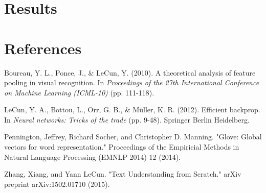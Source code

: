 \documentclass{article}
\begin{document}
\section*{Results}


\section*{References}

Boureau, Y. L., Ponce, J., \& LeCun, Y. (2010). A theoretical analysis of feature pooling in visual recognition. In \emph{Proceedings of the 27th International Conference on Machine Learning (ICML-10)} (pp. 111-118).

LeCun, Y. A., Bottou, L., Orr, G. B., \& Müller, K. R. (2012). Efficient backprop. In \emph{Neural networks: Tricks of the trade} (pp. 9-48). Springer Berlin Heidelberg.

Pennington, Jeffrey, Richard Socher, and Christopher D. Manning. "Glove: Global vectors for word representation." Proceedings of the Empiricial Methods in Natural Language Processing (EMNLP 2014) 12 (2014).

Zhang, Xiang, and Yann LeCun. "Text Understanding from Scratch." arXiv preprint arXiv:1502.01710 (2015).
\end{document}
